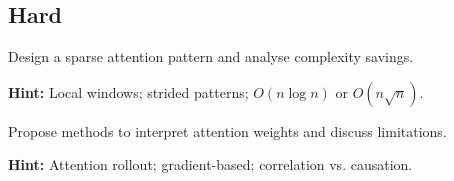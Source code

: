 \subsection*{Hard}

\begin{problem}
Design a sparse attention pattern and analyse complexity savings.

\textbf{Hint:} Local windows; strided patterns; $O(n \log n)$ or $O(n\sqrt{n})$.
\end{problem}

\begin{problem}
Propose methods to interpret attention weights and discuss limitations.

\textbf{Hint:} Attention rollout; gradient-based; correlation vs. causation.
\end{problem}

